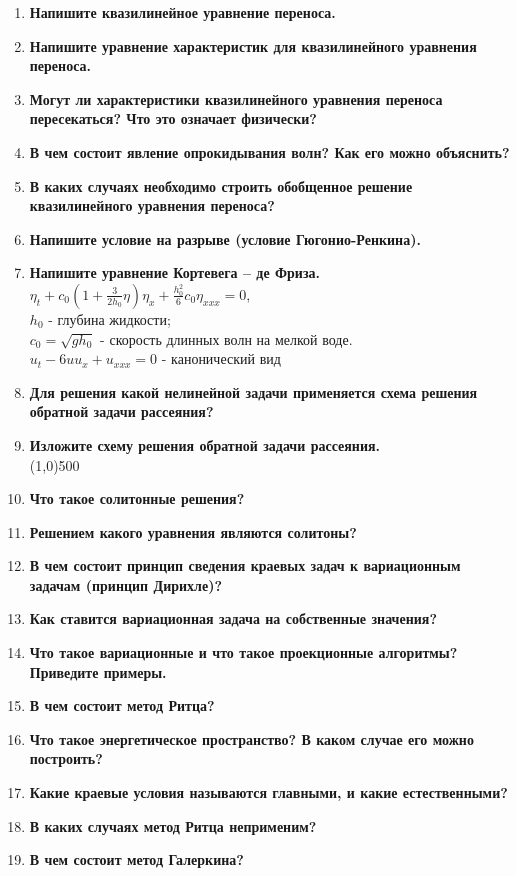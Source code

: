 \begin{enumerate}[label=\textbf{\underline{\arabic*.}}]
\item \textbf{Напишите квазилинейное уравнение переноса.}
\item \textbf{Напишите уравнение характеристик для квазилинейного уравнения переноса.}
\item \textbf{Могут ли характеристики квазилинейного уравнения переноса пересекаться? Что это означает физически?}
\item \textbf{В чем состоит явление опрокидывания волн? Как его можно объяснить?}
\item \textbf{В каких случаях необходимо строить обобщенное решение квазилинейного уравнения переноса?}
\item \textbf{Напишите условие на разрыве (условие Гюгонио-Ренкина).}
\item \textbf{Напишите уравнение Кортевега – де Фриза.}\\
      $\eta_t+c_0(1+\frac3{2h_0}\eta)\eta_x+\frac{h_0^2}{6}c_0\eta_{xxx}=0 $,\\
      $h_0$ - глубина жидкости;\\
      $c_0 = \sqrt{gh_0}$ - скорость длинных волн на мелкой воде.\\
      $u_t-6uu_x+u_{xxx}=0 $ - канонический вид
\item \textbf{Для решения какой нелинейной задачи применяется схема решения обратной задачи рассеяния?}
\item \textbf{Изложите схему решения обратной задачи рассеяния.}\\
\line(1,0){500}
\item \textbf{Что такое солитонные решения?}
\item \textbf{Решением какого уравнения являются солитоны?}
\item \textbf{В чем состоит принцип сведения краевых задач к вариационным задачам (принцип Дирихле)?}
\item \textbf{Как ставится вариационная задача на собственные значения?}
\item \textbf{Что такое вариационные и что такое проекционные алгоритмы? Приведите примеры.}
\item \textbf{В чем состоит метод Ритца?}
\item \textbf{Что такое энергетическое пространство? В каком случае его можно построить?}
\item \textbf{Какие краевые условия называются главными, и какие естественными?}
\item \textbf{В каких случаях метод Ритца неприменим?}
\item \textbf{В чем состоит метод Галеркина?}

\end{enumerate}
